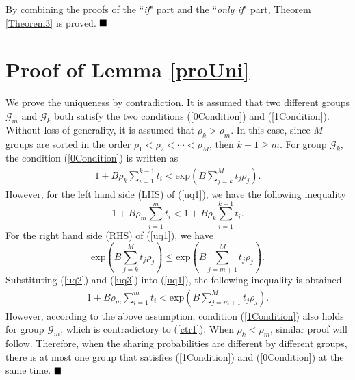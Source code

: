 \documentclass[12pt, draftclsnofoot, onecolumn]{IEEEtran}
\begin{document}
By combining the proofs of the ``\textit{if}" part and the ``\textit{only if}" part, Theorem \ref{Theorem3} is proved.
$\hfill\blacksquare$


\section{Proof of Lemma \ref{proUni}}
\setcounter{equation}{0}
\renewcommand{\theequation}{\thesection.\arabic{equation}}
We prove the uniqueness by contradiction. It is assumed that two different groups $\mathcal{G}_m$ and $\mathcal{G}_k$ both satisfy the two conditions (\ref {0Condition}) and (\ref {1Condition}).
Without loss of generality, it is assumed that $\rho_k > \rho_m $. In this case, since $M$ groups are sorted in the order $\rho_1 < \rho_2 <\cdots < \rho_M$, then $k-1 \geq m$. For group $\mathcal{G}_k$, the condition (\ref {0Condition}) is written as
\begin{eqnarray} \label{uq1}
 1+B \rho_k \sum\limits_{i=1}^{k-1} t_i < \textrm{exp}\left(B\sum\limits_{j=k}^{M} t_j\rho_j\right).
\end{eqnarray}
However, for the left hand side (LHS) of (\ref{uq1}), we have the following inequality
\begin{equation}
1+B \rho_m \sum\limits_{i=1}^{m} t_i <  1+B \rho_k \sum\limits_{i=1}^{k-1} t_i. \label{uq2}
\end{equation}
For the right hand side (RHS) of (\ref{uq1}), we have
\begin{equation}
\textrm{exp}\left(B\sum\limits_{j=k}^{M} t_j\rho_j\right)\leq\textrm{exp}\left(B\sum\limits_{j=m+1}^{M} t_j\rho_j\right). \label{uq3}
\end{equation}
Substituting (\ref{uq2}) and (\ref{uq3}) into (\ref{uq1}), the following inequality is obtained.
\begin{eqnarray}\label{ctr1}
1+B \rho_m \sum\limits_{i=1}^{m} t_i <\textrm{exp}(B\sum\limits_{j=m+1}^{M} t_j\rho_j).
\end{eqnarray}
However, according to the above assumption, condition (\ref {1Condition}) also holds for group $\mathcal{G}_m$, which is contradictory to (\ref {ctr1}).
When $\rho_k < \rho_m $, similar proof will follow.
Therefore, when the sharing probabilities are different by different groups, there is at most one group that satisfies (\ref{1Condition}) and (\ref{0Condition}) at the same time.
$\hfill\blacksquare$


\vspace{-2em}
\end{document}
